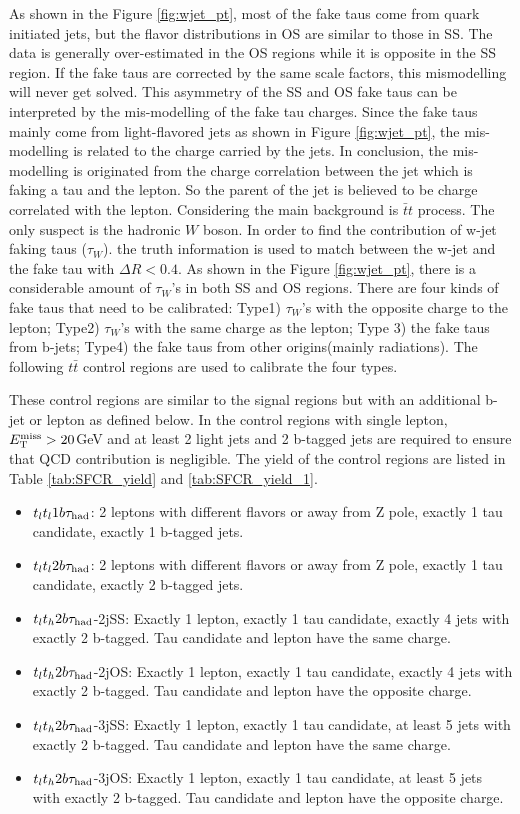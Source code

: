As shown in the Figure \ref{fig:wjet_pt}, most of the fake taus come from quark initiated jets, but the flavor distributions in OS are similar to those in SS. The data is generally over-estimated in the OS regions while it is opposite in the SS region. If the fake taus are corrected by the same scale factors, this mismodelling will never get solved. This asymmetry of the SS and OS fake taus can be interpreted by the mis-modelling of the fake tau charges. Since the fake taus mainly come from light-flavored jets as shown in Figure \ref{fig:wjet_pt}, the mis-modelling is related to the charge carried by the jets. In conclusion, the mis-modelling is originated from the charge correlation between the jet which is faking a tau and the lepton. So the parent of the jet is believed to be charge correlated with the lepton. Considering the main background is $\bar{t}t$ process. The only suspect is the hadronic $W$ boson. In order to find the contribution of w-jet faking taus ($\tau_{W}$).  the truth information is used to match between the w-jet and the fake tau with $\Delta R < 0.4$. As shown in the Figure \ref{fig:wjet_pt}, there is a considerable amount of $\tau_{W}$'s in both SS and OS regions. There are four kinds of fake taus that need to be calibrated: Type1) $\tau_{W}$'s with the opposite charge to the lepton; Type2) $\tau_{W}$'s with the same charge as the lepton; Type 3) the fake taus from b-jets; Type4) the fake taus from other origins(mainly radiations). The following
$t\bar t$ control regions are used to calibrate the four types.

These control regions are similar to the signal regions but with an additional b-jet or lepton as defined below. In the control regions with single lepton, $E_{\text{T}}^{\text{miss}} > 20$GeV and at least 2 light jets and 2 b-tagged jets are required to ensure that QCD contribution is negligible. The yield of the control regions are listed in Table \ref{tab:SFCR_yield} and \ref{tab:SFCR_yield_1}.

\begin{itemize}
\item{$t_lt_l1b\tau_\text{had}$: 2 leptons with different flavors or away from Z pole, exactly 1 tau candidate,  exactly 1 b-tagged jets.}
\item{$t_lt_l2b\tau_\text{had}$: 2 leptons with different flavors or away from Z pole, exactly 1 tau candidate,  exactly 2 b-tagged jets.}
\item{$t_lt_h2b\tau_\text{had}$-2jSS: Exactly 1 lepton, exactly 1 tau candidate, exactly 4 jets with exactly 2 b-tagged. Tau candidate and lepton have the same charge.}
\item{$t_lt_h2b\tau_\text{had}$-2jOS: Exactly 1 lepton, exactly 1 tau candidate, exactly 4 jets with exactly 2 b-tagged. Tau candidate and lepton have the opposite charge.}
\item{$t_lt_h2b\tau_\text{had}$-3jSS: Exactly 1 lepton, exactly 1 tau candidate, at least 5 jets with exactly 2 b-tagged. Tau candidate and lepton have the same charge.}
\item{$t_lt_h2b\tau_\text{had}$-3jOS: Exactly 1 lepton, exactly 1 tau candidate, at least 5 jets with exactly 2 b-tagged. Tau candidate and lepton have the opposite charge.}
\end{itemize}


